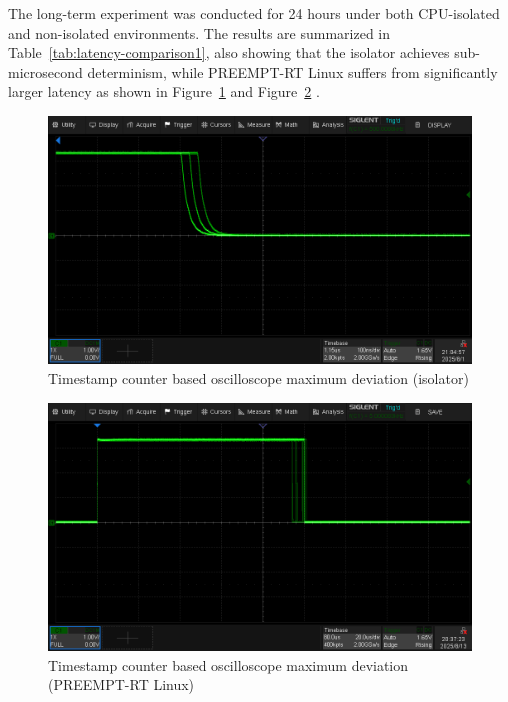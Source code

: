 \documentclass[letterpaper]{article}
\begin{document}
The long-term experiment was conducted for 24 hours under both CPU-isolated and non-isolated environments. The results are summarized in Table~\ref{tab:latency-comparison1}, also showing that the isolator achieves sub-microsecond determinism, while PREEMPT-RT Linux suffers from significantly larger latency
as shown in Figure~\ref{fig:islcountergpio} and Figure~\ref{fig:linuxcountergpio} .

\begin{figure}[h]
  \centering
  \includegraphics[width=0.8\linewidth]{figures/islcountergpio.png}
  \caption{Timestamp counter based oscilloscope maximum deviation (isolator)}
  \label{fig:islcountergpio}
\end{figure}

\begin{figure}[h]
  \centering
  \includegraphics[width=0.8\linewidth]{figures/linuxcountergpio.png}
  \caption{Timestamp counter based oscilloscope maximum deviation (PREEMPT-RT Linux)}
  \label{fig:linuxcountergpio}
\end{figure}



\begin{table}[t]
\centering
\caption{Latency measurements over a 24-hour period (corresponding to Figures~\ref{fig:islintgpio} and~\ref{fig:linuxintgpio}).}
\label{tab:latency-comparison}
\end{table}
\end{document}
